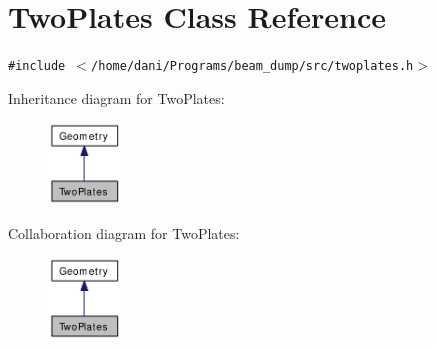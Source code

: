 \hypertarget{classTwoPlates}{
\section{TwoPlates Class Reference}
\label{classTwoPlates}
}
{\tt \#include $<$/home/dani/Programs/beam\_\-dump/src/twoplates.h$>$}

Inheritance diagram for TwoPlates:\nopagebreak
\begin{figure}[H]
\begin{center}
\leavevmode
\includegraphics[width=55pt]{classTwoPlates__inherit__graph}
\end{center}
\end{figure}
Collaboration diagram for TwoPlates:\nopagebreak
\begin{figure}[H]
\begin{center}
\leavevmode
\includegraphics[width=55pt]{classTwoPlates__coll__graph}
\end{center}
\end{figure}
